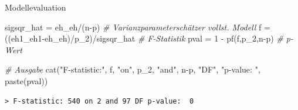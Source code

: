 \documentclass[
  8pt,
  ignorenonframetext,
]{beamer}
\newenvironment{Shaded}{\begin{snugshade}}{\end{snugshade}}
\newcommand{\CommentTok}[1]{\textcolor[rgb]{0.56,0.35,0.01}{\textit{#1}}}
\newcommand{\DecValTok}[1]{\textcolor[rgb]{0.00,0.00,0.81}{#1}}
\newcommand{\FunctionTok}[1]{\textcolor[rgb]{0.00,0.00,0.00}{#1}}
\newcommand{\NormalTok}[1]{#1}
\newcommand{\OtherTok}[1]{\textcolor[rgb]{0.56,0.35,0.01}{#1}}
\newcommand{\SpecialCharTok}[1]{\textcolor[rgb]{0.00,0.00,0.00}{#1}}
\newcommand{\StringTok}[1]{\textcolor[rgb]{0.31,0.60,0.02}{#1}}
\begin{document}
\begin{frame}[fragile]{Modellevaluation}
\begin{Shaded}
\begin{Highlighting}[]
\NormalTok{sigsqr\_hat }\OtherTok{=}\NormalTok{ eh\_eh}\SpecialCharTok{/}\NormalTok{(n}\SpecialCharTok{{-}}\NormalTok{p)                                      }\CommentTok{\# Varianzparameterschätzer vollst. Modell}
\NormalTok{f          }\OtherTok{=}\NormalTok{ ((eh1\_eh1}\SpecialCharTok{{-}}\NormalTok{eh\_eh)}\SpecialCharTok{/}\NormalTok{p\_2)}\SpecialCharTok{/}\NormalTok{sigsqr\_hat                 }\CommentTok{\# F{-}Statistik}
\NormalTok{pval       }\OtherTok{=} \DecValTok{1} \SpecialCharTok{{-}} \FunctionTok{pf}\NormalTok{(f,p\_2,n}\SpecialCharTok{{-}}\NormalTok{p)                                }\CommentTok{\# p{-}Wert}

\CommentTok{\# Ausgabe}
\FunctionTok{cat}\NormalTok{(}\StringTok{"F{-}statistic:"}\NormalTok{, f, }\StringTok{"on"}\NormalTok{, p\_2, }\StringTok{"and"}\NormalTok{, n}\SpecialCharTok{{-}}\NormalTok{p, }\StringTok{"DF"}\NormalTok{, }\StringTok{"p{-}value: "}\NormalTok{, }\FunctionTok{paste}\NormalTok{(pval))}
\end{Highlighting}
\end{Shaded}

\begin{verbatim}
> F-statistic: 540 on 2 and 97 DF p-value:  0
\end{verbatim}
\end{frame}
\end{document}
